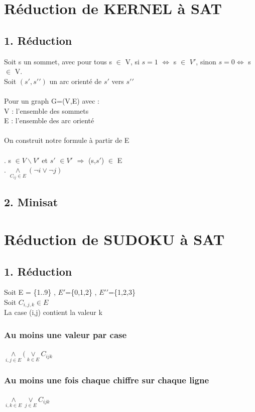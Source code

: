 \documentclass[12pt]{report}
\begin{document}
\section*{Réduction de KERNEL à SAT}
\subsection*{1. Réduction}

Soit s un sommet, avec pour tous s $\in$ V, si $s=1$ $\Leftrightarrow$ s $\in$ $V\prime$, sinon $ s=0 \Leftrightarrow$ s $\in$ V. \\
Soit $(s\prime, s\prime\prime)$ un arc orienté de $s\prime$ vers $s\prime\prime$\\
\\
Pour un graph G=(V,E) avec : \\
V : l'ensemble des sommets\\
E : l'ensemble des arc orienté\\
\\
On construit notre formule à partir de E\\
\\
. s $\in V\backslash V\prime$ et $s\prime$ $ \in V\prime$ $\Longrightarrow$ (s,$s\prime$) $\in$ E\\
. $\underset{C_{ij} \in E}{\land} (\lnot i \lor \lnot j)$
\subsection*{2. Minisat}

\section*{Réduction de SUDOKU à SAT}
\subsection*{1. Réduction}
Soit E = \{1..9\} , $E\prime$=\{0,1,2\} , $E\prime\prime$=\{1,2,3\}\\
Soit $C_{i,j,k} \in E$\\
La case (i,j) contient la valeur k
\subsubsection*{Au moins une valeur par case}
$\underset{i,j \in E}{\land} (\underset{k \in E}{\lor} C_{ijk}$
\subsubsection*{Au moins une fois chaque chiffre sur chaque ligne}
$\underset{i,k \in E}{\land} \underset{j \in E}{\lor} C_{ijk}$
\end{document}
